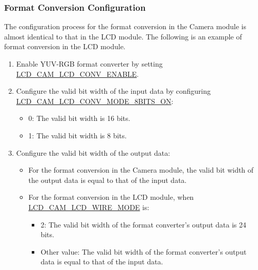 \documentclass[main\_\_EN.tex]{subfiles}
\begin{document}
\subsubsection{Format Conversion Configuration}
The configuration process for the format conversion in the Camera module is almost identical to that in the LCD module. The following is an example of format conversion in the LCD module.

\begin{enumerate}
    \item Enable YUV-RGB format converter by setting  \hyperref[fielddesc:LCDCAMLCDCONVENABLE]{LCD\_CAM\_LCD\_CONV\_ENABLE}.
    \item Configure the valid bit width of the input data by configuring \hyperref[fielddesc:LCDCAMLCDCONVMODE8BITSON]{LCD\_CAM\_LCD\_CONV\_MODE\_8BITS\_ON}:
    \begin{itemize}
        \item 0: The valid bit width is 16 bits.
        \item 1: The valid bit width is 8 bits.
    \end{itemize}
    \item Configure the valid bit width of the output data:
        \begin{itemize}
            \item For the format conversion in the Camera module, the valid bit width of the output data is equal to that of the input data.
            \item For the format conversion in the LCD module, when \hyperref[fielddesc:LCDCAMLCDWIREMODE]{LCD\_CAM\_LCD\_WIRE\_MODE} is:
            \begin{itemize}
                \item 2: The valid bit width of the format converter's output data is 24 bits.
                \item Other value: The valid bit width of the format converter's output data is equal to that of the input data.
            \end{itemize}
        \end{itemize}


\end{enumerate}
\end{document}
